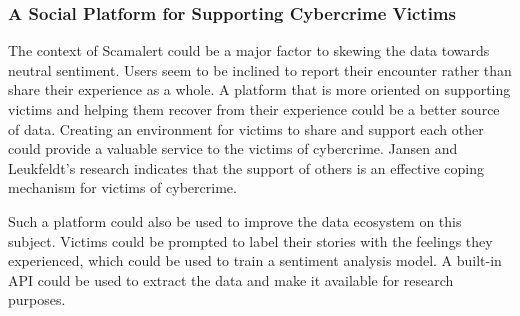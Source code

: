 \subsubsection*{A Social Platform for Supporting Cybercrime Victims}

The context of Scamalert could be a major factor to skewing the data towards neutral sentiment. Users seem to be inclined to report their encounter rather than share their experience as a whole. A platform that is more oriented on supporting victims and helping them recover from their experience could be a better source of data. Creating an environment for victims to share and support each other could provide a valuable service to the victims of cybercrime. Jansen and Leukfeldt's research indicates that the support of others is an effective coping mechanism for victims of cybercrime.~\cite{jansen2018coping}

Such a platform could also be used to improve the data ecosystem on this subject. Victims could be prompted to label their stories with the feelings they experienced, which could be used to train a sentiment analysis model. A built-in API could be used to extract the data and make it available for research purposes.